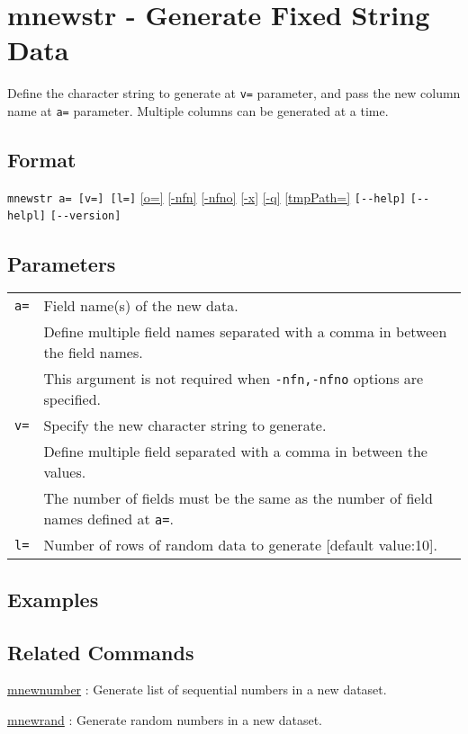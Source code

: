 
%

\section{mnewstr - Generate Fixed String Data\label{sect:mnewstr}}
Define the character string to generate at \verb|v=| parameter, and pass the new column name at \verb|a=| parameter. Multiple columns can be generated at a time. 


\subsection*{Format}
\verb|mnewstr a= [v=] [l=]|
\hyperref[sect:option_o]{[o=]}
\hyperref[sect:option_nfn]{[-nfn]} 
\hyperref[sect:option_nfno]{[-nfno]}  
\hyperref[sect:option_x]{[-x]}
\hyperref[sect:option_q]{[-q]}
\hyperref[sect:option_option_tmppath]{[tmpPath=]}
\verb|[--help]|
\verb|[--helpl]|
\verb|[--version]|\\

\subsection*{Parameters}
\begin{table}[htbp]
{\small
\begin{tabular}{ll}
\verb|a=|    & Field name(s) of the new data. \\
             & Define multiple field names separated with a comma in between the field names. \\
             & This argument is not required when  \verb|-nfn,-nfno| options are specified.\\
\verb|v=|    & Specify the new character string to generate. \\
             & Define multiple field separated with a comma in between the values. \\
             & The number of fields must be the same as the number of field names defined at \verb|a=|.  \\
\verb|l=|    & Number of rows of random data to generate [default value:10]. \\

\end{tabular} 
}
\end{table} 


\subsection*{Examples}

\subsection*{Related Commands}
\hyperref[sect:mnewnumber] {mnewnumber} : Generate list of sequential numbers in a new dataset. 

\hyperref[sect:mnewrand] {mnewrand} : Generate random numbers in a new dataset. 

%
